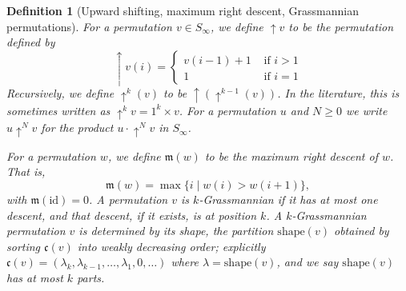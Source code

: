 \documentclass[pdflatex,sn-mathphys-num]{sn-jnl}
\numberwithin{equation}{subsection}
\newcommand{\shup}{{\uparrow}}
\newcommand{\code}{\mathfrak{c}}
\newcommand{\maxd}{\mathfrak{m}}
\theoremstyle{thmstyleone}
\theoremstyle{thmstylethree}
\newtheorem{definition}[lemma]{Definition}
\theoremstyle{thmstyletwo}
\begin{document}
\begin{definition}[Upward shifting, maximum right descent, Grassmannian permutations]
For a permutation $v\in S_\infty$, we define $\shup{v}$ to be the permutation defined by
$$\shup{v}(i) = \begin{cases}
	v(i-1)+1&\mbox{ if }i>1\\
	1&\mbox{ if }i=1
\end{cases}$$
Recursively, we define $\shup^k(v)$ to be $\shup(\shup^{k-1}(v))$. In the literature, this is sometimes written as $\shup^kv = 1^k\times v$. For a permutation $u$ and $N\geq 0$ we write $u\shup^N v$ for the product $u\cdot\shup^N v$ in $S_\infty$.

For a permutation $w$, we define $\maxd(w)$ to be the maximum right descent of $w$. That is,
$$\maxd(w) = \max\{i\mid w(i)>w(i+1)\},$$
with $\maxd(\mathrm{id})=0$. A permutation $v$ is \emph{$k$-Grassmannian} if it has at most one descent, and that descent, if it exists, is at position $k$. A $k$-Grassmannian permutation $v$ is determined by its \emph{shape}, the partition $\mathrm{shape}(v)$ obtained by sorting $\code(v)$ into weakly decreasing order; explicitly $\code(v) = (\lambda_k,\lambda_{k-1},\ldots,\lambda_1,0,\ldots)$ where $\lambda=\mathrm{shape}(v)$, and we say $\mathrm{shape}(v)$ has at most $k$ parts.
\end{definition}
\end{document}
